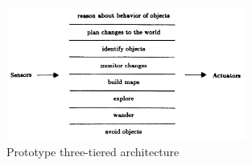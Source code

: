 \documentclass[%
paper=A4,               %
twoside=true,           %
openright,              %
11pt,                   %
bibliography=totoc,     %
titlepage=on,           %
DIV=12,                 %
BCOR=1.5cm,             %
parskip=half,            %
final
]{scrreprt}
\begin{document}
	\begin{figure}[ht]
		\centering
		\includegraphics[width=0.7\textwidth]{Graphics/three-layered-Architecture}
		\caption{Prototype three-tiered architecture \autocite{sicilianoSpringerHandbookRobotics2016}}
		\label{fig: fig3}
	\end{figure}
	\newpage
	
\end{document}
